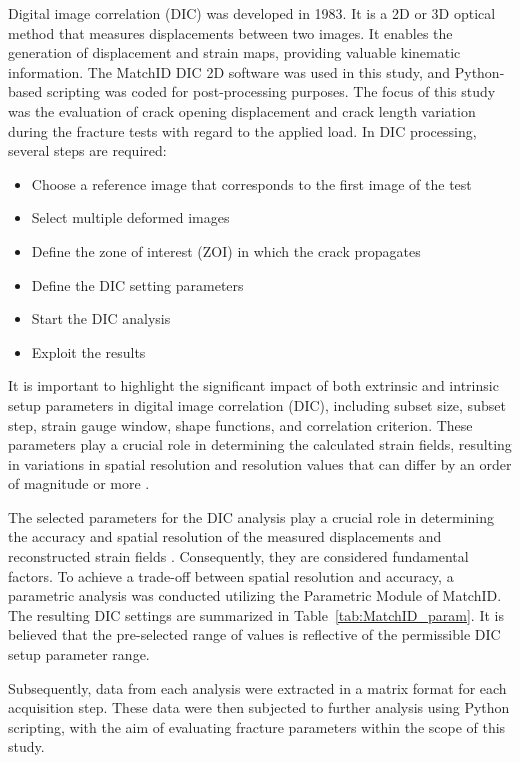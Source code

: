 \documentclass[3p,times,procedia]{elsarticle}
\begin{document}
Digital image correlation (DIC) was developed in 1983. It is a 2D or 3D optical method that measures displacements between two images. It enables the generation of displacement and strain maps, providing valuable kinematic information. The MatchID DIC 2D software was used in this study, and Python-based scripting was coded for post-processing purposes.
The focus of this study was the evaluation of crack opening displacement and crack length variation during the fracture tests with regard to the applied load.
In DIC processing, several steps are required:

\begin{itemize}
	\item Choose a reference image that corresponds to the first image of the test 
	\item Select multiple deformed images
	\item Define the zone of interest (ZOI) in which the crack propagates
	\item Define the  DIC setting parameters
	\item Start the DIC analysis
	\item Exploit the results
\end{itemize}

It is important to highlight the significant impact of both extrinsic and intrinsic setup parameters in digital image correlation (DIC), including subset size, subset step, strain gauge window, shape functions, and correlation criterion. These parameters play a crucial role in determining the calculated strain fields, resulting in variations in spatial resolution and resolution values that can differ by an order of magnitude or more \citep{DICguide2018}. 

The selected parameters for the DIC analysis play a crucial role in determining the accuracy and spatial resolution of the measured displacements and reconstructed strain fields \citep{Xavier2012207,PereiraandXavier2018}. Consequently, they are considered fundamental factors. To achieve a trade-off between spatial resolution and accuracy, a parametric analysis was conducted utilizing the Parametric Module of MatchID. The resulting DIC settings are summarized in Table~\ref{tab:MatchID_param}. It is believed that the pre-selected range of values is reflective of the permissible DIC setup parameter range.

Subsequently, data from each analysis were extracted in a matrix format for each acquisition step. These data were then subjected to further analysis using Python scripting, with the aim of evaluating fracture parameters within the scope of this study.
\end{document}
